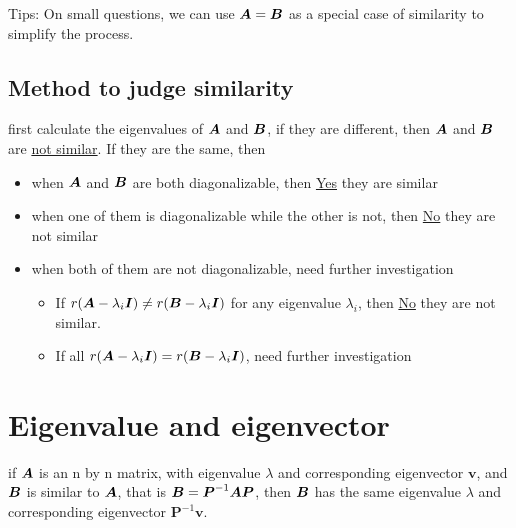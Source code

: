 \documentclass{overview}
\begin{document}
Tips: On small questions, we can use $\boldsymbol{A}=\boldsymbol{B}$ as a special case of similarity to
simplify the process.



\subsection{Method to judge similarity}

first calculate the eigenvalues of $\boldsymbol{A}$ and $\boldsymbol{B}$, if they are different,
then $\boldsymbol{A}$ and $\boldsymbol{B}$ are \underline{not similar}. If they are the same, then
\begin{itemize}
	\item when $\boldsymbol{A}$ and $\boldsymbol{B}$ are both diagonalizable, then \underline{Yes} they are similar
	\item when one of them is diagonalizable while the other is not, then \underline{No} they are not similar
	\item when both of them are not diagonalizable, need further investigation
		\begin{itemize}
			\item If $r(\boldsymbol{A}-\lambda_i \boldsymbol{I}) \neq r(\boldsymbol{B}-\lambda_i \boldsymbol{I})$ for any eigenvalue $\lambda_i$,
				then \underline{No} they are not similar.
			\item If all $r(\boldsymbol{A}-\lambda_i \boldsymbol{I}) = r(\boldsymbol{B}-\lambda_i \boldsymbol{I})$, need further investigation
		\end{itemize}
\end{itemize}

\section{Eigenvalue and eigenvector}

if $\boldsymbol{A}$ is an n by n matrix, with eigenvalue $\lambda$ and corresponding eigenvector $\boldsymbol{v}$,
and $\boldsymbol{B}$ is similar to $\boldsymbol{A}$, that is $\boldsymbol{B} = \boldsymbol{P}^{-1}\boldsymbol{A} \boldsymbol{P}$,
then $\boldsymbol{B}$ has the same eigenvalue $\lambda$ and corresponding eigenvector
$\boldsymbol{P}^{-1}\boldsymbol{v}$.
\end{document}
